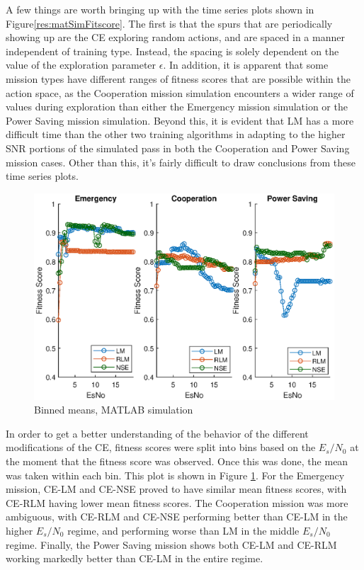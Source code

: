 
\par A few things are worth bringing up with the time series plots shown in Figure\ref{res:matSimFitscore}. The first is that the spurs that are periodically showing up are the CE exploring random actions, and are spaced in a manner independent of training type. Instead, the spacing is solely dependent on the value of the exploration parameter $\epsilon$. In addition, it is apparent that some mission types have different ranges of fitness scores that are possible within the action space, as the Cooperation mission simulation encounters a wider range of values during exploration than either the Emergency mission simulation or the Power Saving mission simulation. Beyond this, it is evident that LM has a more difficult time than the other two training algorithms in adapting to the higher SNR portions of the simulated pass in both the Cooperation and Power Saving mission cases. Other than this, it's fairly difficult to draw conclusions from these time series plots.
\FloatBarrier
\begin{figure}[!ht]
\centering
\includegraphics[width=\linewidth]{figures/matlab_sim_results/binnedMeans_sim.eps}
\caption{Binned means, MATLAB simulation}
\label{res:matSimBinMean}
\end{figure}
\par In order to get a better understanding of the behavior of the different modifications of the CE, fitness scores were split into bins based on the $E_s/N_0$ at the moment that the fitness score was observed. Once this was done, the mean was taken within each bin. This plot is shown in Figure \ref{res:matSimBinMean}. For the Emergency mission, CE-LM and CE-NSE proved to have similar mean fitness scores, with CE-RLM having lower mean fitness scores. The Cooperation mission was more ambiguous, with CE-RLM and CE-NSE performing better than CE-LM in the higher $E_s/N_0$ regime, and performing worse than LM in the middle $E_s/N_0$ regime. Finally, the Power Saving mission shows both CE-LM and CE-RLM working markedly better than CE-LM in the entire regime.

